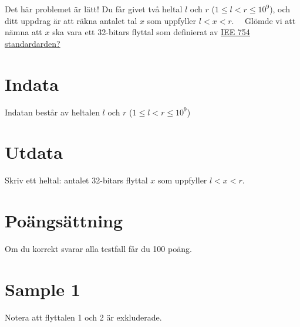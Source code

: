 \noindent

Det här problemet är lätt! Du får givet två heltal $l$ och $r$ ($1 \leq l < r \leq 10^9$), och
ditt uppdrag är att räkna antalet tal $x$ som uppfyller $l < x < r$.
\
\
Glömde vi att nämna att $x$ ska vara ett 32-bitars flyttal som definierat av
\href{https://sci-hub.3800808.com/10.1109/ieeestd.2008.4610935}{IEE 754 standardarden?}

\section*{Indata}
\noindent
Indatan består av heltalen $l$ och $r$ ($1 \leq l < r \leq 10^9$)

\section*{Utdata}
\noindent
Skriv ett heltal: antalet 32-bitars flyttal $x$ som uppfyller $l < x < r$.


\section*{Poängsättning}
Om du korrekt svarar alla testfall får du 100 poäng.

\section*{Sample 1}
Notera att flyttalen 1 och 2 är exkluderade.
